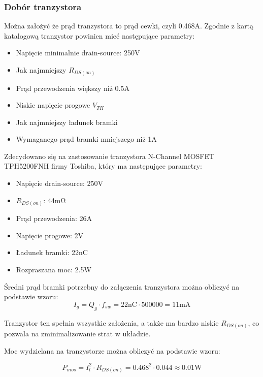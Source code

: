 \documentclass[../../main.tex]{subfiles}
\begin{document}
\subsubsection{Dobór tranzystora}
Można założyć że prąd tranzystora to prąd cewki, czyli 0.468\si{\ampere}.
Zgodnie z kartą katalogową tranzystor powinien mieć następujące parametry:
\begin{itemize}
    \item Napięcie minimalnie drain-source: 250\si{\volt}
    \item Jak najmniejszy $R_{DS(on)}$
    \item Prąd przewodzenia większy niż 0.5\si{\ampere}
    \item Niskie napięcie progowe $V_{TH}$
    \item Jak najmniejszy ładunek bramki
    \item Wymaganego prąd bramki mniejszego niż 1\si{\ampere}
\end{itemize}

Zdecydowano się na zastosowanie tranzystora N-Channel
MOSFET TPH5200FNH firmy Toshiba, który ma następujące parametry:
\begin{itemize}
    \item Napięcie drain-source: 250\si{\volt}
    \item $R_{DS(on)}$: 44\si{\milli\ohm}
    \item Prąd przewodzenia: 26\si{\ampere}
    \item Napięcie progowe: 2\si{\volt}
    \item Ładunek bramki: 22\si{\nano\coulomb}
    \item Rozpraszana moc: 2.5\si{\watt}
\end{itemize}

Średni prąd bramki potrzebny do załączenia tranzystora można obliczyć na podstawie wzoru:
\begin{equation}
    I_{g} = Q_{g} \cdot f_{sw} = 22\si{\nano\coulomb} \cdot 500000 = 11\si{\milli\ampere}
\end{equation}


Tranzystor ten spełnia wszystkie założenia, a także ma bardzo niskie $R_{DS(on)}$, co pozwala na zminimalizowanie strat w układzie.

Moc wydzielana na tranzystorze można obliczyć na podstawie wzoru:

\begin{equation}
    P_{mos} = I_{l}^2 \cdot R_{DS(on)} = 0.468^2 \cdot 0.044 \approx 0.01\si{\watt}
\end{equation}
\end{document}
